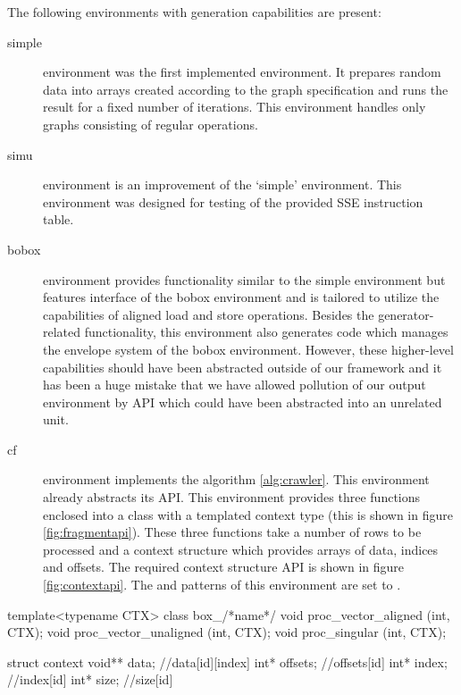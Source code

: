 The following environments with generation capabilities are present:
\begin{description}
  \item[simple] environment was the first implemented environment. It prepares random data into arrays created according to the graph specification and runs the result for a fixed number of iterations. This environment handles only graphs consisting of regular operations.

  \item[simu] environment is an improvement of the `simple' environment. This environment was designed for testing of the provided SSE instruction table.

  \item[bobox] environment provides functionality similar to the simple environment but features interface of the bobox environment and is tailored to utilize the capabilities of aligned load and store operations. Besides the generator-related functionality, this environment also generates code which manages the envelope system of the bobox environment. However, these higher-level capabilities should have been abstracted outside of our framework and it has been a huge mistake that we have allowed pollution of our output environment by API which could have been abstracted into an unrelated unit.

  \item[cf] environment implements the algorithm \ref{alg:crawler}. This environment already abstracts its API. This environment provides three functions enclosed into a class with a templated context type (this is shown in figure \ref{fig:fragmentapi}). These three functions take a number of rows to be processed and a context structure which provides arrays of data, indices and offsets. The required context structure API is shown in figure \ref{fig:contextapi}. The  and  patterns of this environment are set to . 
\end{description}

\mybeginfig
\begin{code}
template<typename CTX>
class box_/*name*/
{
  void proc_vector_aligned   (int, CTX);
  void proc_vector_unaligned (int, CTX);
  void proc_singular         (int, CTX);
}
\end{code}


\mybeginfig
\begin{code}
struct context
{
  void** data;   //data[id][index]
  int* offsets; //offsets[id]
  int* index;   //index[id]
  int* size;    //size[id]
}
\end{code}

